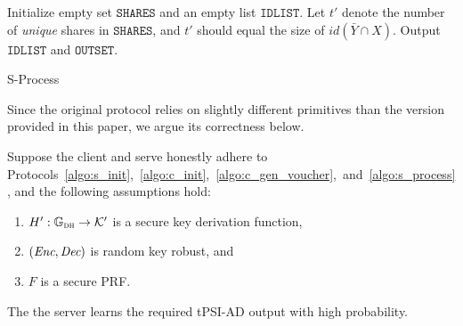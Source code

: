 \begin{algorithm}[H]
\DontPrintSemicolon
Initialize empty set $\texttt{{SHARES}}$ and an empty list $\texttt{IDLIST}$.\;
Let $t'$ denote the number of \emph{unique} shares in $\texttt{SHARES}$, and $t'$ should equal the size of $id (\bar{Y} \cap X)$. \; 
Output $\texttt{IDLIST}$ and $\texttt{OUTSET}$.\; 
\caption{{\sf S-Process}} 
\label{algo:s_process}

\end{algorithm}
Since the original protocol relies on slightly different primitives than the version provided in this paper, we argue its correctness below.
\begin{theorem}[Correctness]
Suppose the client and serve honestly adhere to Protocols~\ref{algo:s_init},~\ref{algo:c_init},~\ref{algo:c_gen_voucher},~and~\ref{algo:s_process}, and the following assumptions hold:
\begin{enumerate}[label=(\roman*)]
    \item  $H' : \mathbb{G}_{\textsc{dh}} \to \mathcal{K}'$ is a secure key derivation function,
    \item $(\emph{\text{Enc}}, \emph{\text{Dec}})$ is random key robust, and
    \item $F$ is a secure PRF.
\end{enumerate}
The the server learns the required tPSI-AD output with high probability.
\end{theorem}




